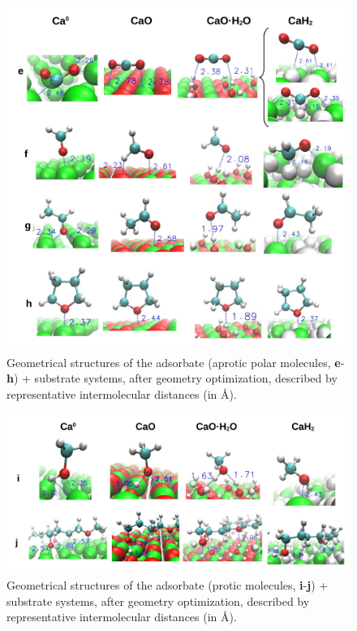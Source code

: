 \documentclass[journal=jpccck,manuscript=article]{achemso}
\begin{document}
\begin{figure}[!h]
	\centering
	\includegraphics[width=\linewidth]{Figure9}
	\caption{Geometrical structures of the adsorbate (aprotic polar molecules, \textbf{e}-\textbf{h}) + substrate systems, after geometry optimization, described by representative intermolecular distances (in \si{\angstrom}). }
	\label{fig:distsei}
\end{figure}

\begin{figure}[!h]
	\centering
	\includegraphics[width=\linewidth]{Figure10}
	\caption{Geometrical structures of the adsorbate (protic molecules, \textbf{i}-\textbf{j}) + substrate systems, after geometry optimization, described by representative intermolecular distances (in \si{\angstrom}). }
	\label{fig:distsj}
\end{figure}
\end{document}

